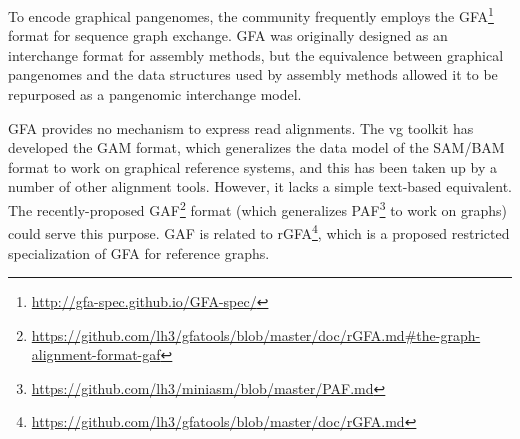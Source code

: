 To encode graphical pangenomes, the community frequently employs the GFA\footnote{\url{http://gfa-spec.github.io/GFA-spec/}} format for sequence graph exchange.
GFA was originally designed as an interchange format for assembly methods, but the equivalence between graphical pangenomes and the data structures used by assembly methods allowed it to be repurposed as a pangenomic interchange model.

GFA provides no mechanism to express read alignments.
The vg toolkit has developed the GAM format, which generalizes the data model of the SAM/BAM format to work on graphical reference systems, and this has been taken up by a number of other alignment tools.
However, it lacks a simple text-based equivalent.
The recently-proposed GAF\footnote{\url{https://github.com/lh3/gfatools/blob/master/doc/rGFA.md#the-graph-alignment-format-gaf}} format (which generalizes PAF\footnote{\url{https://github.com/lh3/miniasm/blob/master/PAF.md}} to work on graphs) could serve this purpose.
GAF is related to rGFA\footnote{\url{https://github.com/lh3/gfatools/blob/master/doc/rGFA.md}}, which is a proposed restricted specialization of GFA for reference graphs.


